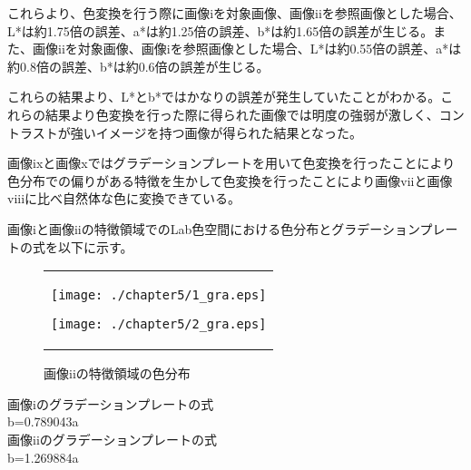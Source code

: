 \newpage
これらより、色変換を行う際に画像iを対象画像、画像iiを参照画像とした場合、L*は約1.75倍の誤差、a*は約1.25倍の誤差、b*は約1.65倍の誤差が生じる。また、画像iiを対象画像、画像iを参照画像とした場合、L*は約0.55倍の誤差、a*は約0.8倍の誤差、b*は約0.6倍の誤差が生じる。\par
これらの結果より、L*とb*ではかなりの誤差が発生していたことがわかる。これらの結果より色変換を行った際に得られた画像では明度の強弱が激しく、コントラストが強いイメージを持つ画像が得られた結果となった。\par

\newpage
画像ixと画像xではグラデーションプレートを用いて色変換を行ったことにより色分布での偏りがある特徴を生かして色変換を行ったことにより画像viiと画像viiiに比べ自然体な色に変換できている。\par

画像iと画像iiの特徴領域でのLab色空間における色分布とグラデーションプレートの式を以下に示す。

\begin{figure}[htbp]
  \begin{center}
    \begin{tabular}{c}

      \begin{minipage}{0.45\hsize}
        \begin{center}
          \texttt{[image: ./chapter5/1\_gra.eps]}
          \caption{画像iの特徴領域の色分布}
          \label{fig:seininhsv}
        \end{center}
      \end{minipage}

      \begin{minipage}{0.45\hsize}
        \begin{center}
          \texttt{[image: ./chapter5/2\_gra.eps]}
          \caption{画像iiの特徴領域の色分布}
          \label{fig:kinninhsv}
        \end{center}
      \end{minipage}


    \end{tabular}
  \end{center}
\end{figure}

\begin{screen}
画像iのグラデーションプレートの式\\
b=0.789043a\\
画像iiのグラデーションプレートの式\\
b=1.269884a
  \end{screen}

